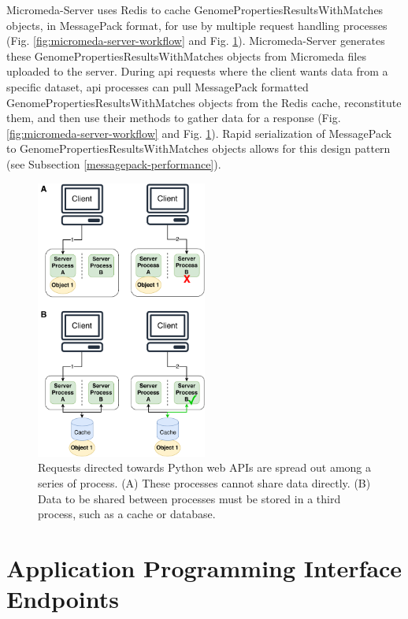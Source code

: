 Micromeda-Server uses Redis to cache GenomePropertiesResultsWithMatches objects, in MessagePack format, for use by multiple request handling processes (Fig. \ref{fig:micromeda-server-workflow} and Fig. \ref{fig:client-processing}). Micromeda-Server generates these GenomePropertiesResultsWithMatches objects from Micromeda files uploaded to the server. During \gls{api} requests where the client wants data from a specific dataset, \gls{api} processes can pull MessagePack formatted GenomePropertiesResultsWithMatches objects from the Redis cache, reconstitute them, and then use their methods to gather data for a response (Fig. \ref{fig:micromeda-server-workflow} and Fig. \ref{endpoints}). Rapid serialization of MessagePack to GenomePropertiesResultsWithMatches objects allows for this design pattern (see Subsection \ref{messagepack-performance}).

\begin{figure}[!ht]
  \centering
	\includegraphics[width=0.50\textwidth]{media/Client-Processing.pdf}
	 \caption{Requests directed towards Python web APIs are spread out among a series of process. (A) These processes cannot share data directly. (B) Data to be shared between processes must be stored in a third process, such as a cache or database.}
	 \label{fig:client-processing}
\end{figure}

\section{Application Programming Interface Endpoints} \label{endpoints}

